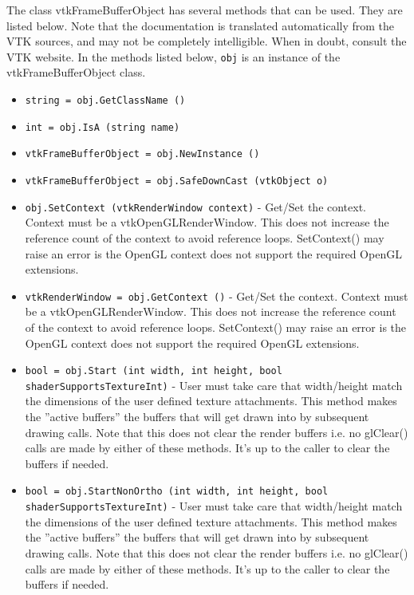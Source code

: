 The class vtkFrameBufferObject has several methods that can be used.
  They are listed below.
Note that the documentation is translated automatically from the VTK sources,
and may not be completely intelligible.  When in doubt, consult the VTK website.
In the methods listed below, \verb|obj| is an instance of the vtkFrameBufferObject class.
\begin{itemize}
\item  \verb|string = obj.GetClassName ()|

\item  \verb|int = obj.IsA (string name)|

\item  \verb|vtkFrameBufferObject = obj.NewInstance ()|

\item  \verb|vtkFrameBufferObject = obj.SafeDownCast (vtkObject o)|

\item  \verb|obj.SetContext (vtkRenderWindow context)| -  Get/Set the context. Context must be a vtkOpenGLRenderWindow. 
 This does not increase the reference count of the 
 context to avoid reference loops.
 SetContext() may raise an error is the OpenGL context does not support the
 required OpenGL extensions.

\item  \verb|vtkRenderWindow = obj.GetContext ()| -  Get/Set the context. Context must be a vtkOpenGLRenderWindow. 
 This does not increase the reference count of the 
 context to avoid reference loops.
 SetContext() may raise an error is the OpenGL context does not support the
 required OpenGL extensions.

\item  \verb|bool = obj.Start (int width, int height, bool shaderSupportsTextureInt)| -  User must take care that width/height match the dimensions of 
 the user defined texture attachments.
 This method makes the ''active buffers'' the buffers that will get drawn
 into by subsequent drawing calls.
 Note that this does not clear the render buffers i.e. no glClear() calls
 are made by either of these methods. It's up to the caller to clear the
 buffers if needed.

\item  \verb|bool = obj.StartNonOrtho (int width, int height, bool shaderSupportsTextureInt)| -  User must take care that width/height match the dimensions of 
 the user defined texture attachments.
 This method makes the ''active buffers'' the buffers that will get drawn
 into by subsequent drawing calls.
 Note that this does not clear the render buffers i.e. no glClear() calls
 are made by either of these methods. It's up to the caller to clear the
 buffers if needed.


\end{itemize}
